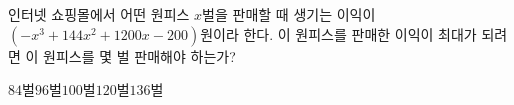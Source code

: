 인터넷 쇼핑몰에서 어떤 원피스 $x$벌을 판매할 때 생기는 이익이 $(-x^3+144x^2+1200x-200)$원이라 한다. 이 원피스를 판매한 이익이 최대가 되려면 이 원피스를 몇 벌 판매해야 하는가? 
\begin{choices32}{$84$벌}{$96$벌}{$100$벌}{$120$벌}{$136$벌}\end{choices32}

